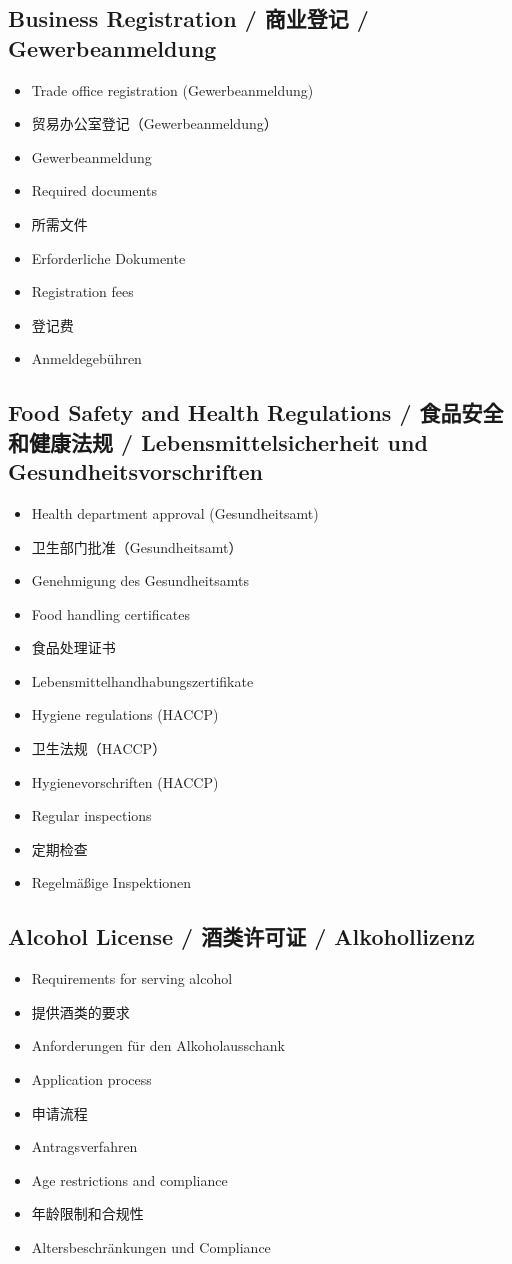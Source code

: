 \subsection{Business Registration / 商业登记 / Gewerbeanmeldung}
\begin{itemize}
    \item Trade office registration (Gewerbeanmeldung)
    \item 贸易办公室登记（Gewerbeanmeldung）
    \item Gewerbeanmeldung
    \item Required documents
    \item 所需文件
    \item Erforderliche Dokumente
    \item Registration fees
    \item 登记费
    \item Anmeldegebühren
\end{itemize}

\subsection{Food Safety and Health Regulations / 食品安全和健康法规 / Lebensmittelsicherheit und Gesundheitsvorschriften}
\begin{itemize}
    \item Health department approval (Gesundheitsamt)
    \item 卫生部门批准（Gesundheitsamt）
    \item Genehmigung des Gesundheitsamts
    \item Food handling certificates
    \item 食品处理证书
    \item Lebensmittelhandhabungszertifikate
    \item Hygiene regulations (HACCP)
    \item 卫生法规（HACCP）
    \item Hygienevorschriften (HACCP)
    \item Regular inspections
    \item 定期检查
    \item Regelmäßige Inspektionen
\end{itemize}

\subsection{Alcohol License / 酒类许可证 / Alkohollizenz}
\begin{itemize}
    \item Requirements for serving alcohol
    \item 提供酒类的要求
    \item Anforderungen für den Alkoholausschank
    \item Application process
    \item 申请流程
    \item Antragsverfahren
    \item Age restrictions and compliance
    \item 年龄限制和合规性
    \item Altersbeschränkungen und Compliance
\end{itemize}

